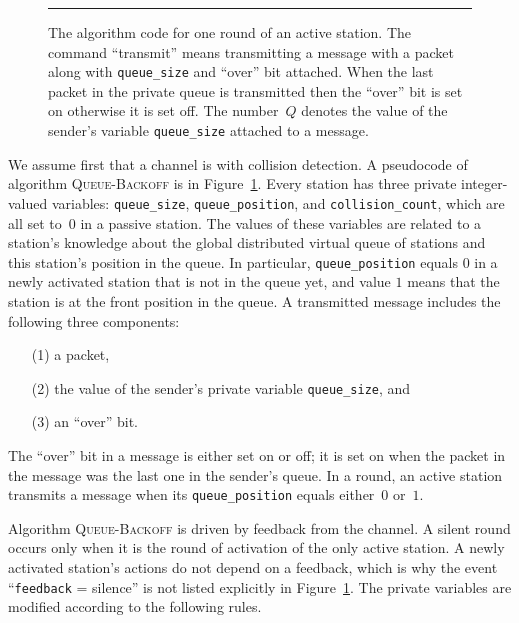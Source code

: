\documentclass[11pt]{article}
\newlength{\captionwidth}
\begin{document}
\begin{figure}[t]
\begin{center}
\rule{\textwidth}{0.75pt}

\parbox{\captionwidth}{\caption{\label{alg:queue-backoff}
The algorithm code for one round of an active station. 
The command ``transmit'' means transmitting a message with a packet along with \texttt{queue\_size} and ``over'' bit attached.
When the last packet in the private queue is transmitted then the  ``over'' bit is set on otherwise it is set off.
The number~$Q$ denotes the value of the sender's variable \texttt{queue\_size} attached to a message.
}}
\end{center}
\end{figure}


We assume first that a channel is with collision detection.
A pseudocode of algorithm \textsc{Queue-Backoff} is in Figure~\ref{alg:queue-backoff}.
Every station has three private integer-valued variables: \texttt{queue\_size}, \texttt{queue\_position}, and \texttt{collision\_count}, which are all set to~$0$ in a passive station.
The values of these variables are related to a station's knowledge about the global distributed virtual queue of stations and this station's position in the queue.
In particular, \texttt{queue\_position} equals $0$ in a newly activated station that is not in the queue yet, and value $1$ means that the station is at the front position in the queue.
A  transmitted message includes the following three components: 
\begin{enumerate}
\item[(1)] a packet, 
\item[(2)] the value of the sender's private variable \texttt{queue\_size}, and 
\item[(3)] an ``over'' bit.
\end{enumerate}
The ``over'' bit in a message is either set on or off; it is set on when the packet in the message was the last one in the sender's queue.
In a round, an active station  transmits a message when its \texttt{queue\_position} equals either~$0$ or~$1$.

Algorithm \textsc{Queue-Backoff} is driven by feedback from the channel.
A silent round occurs only when it is the round of activation of the only active station.
A newly activated station's actions do not depend on a feedback, which is why the event ``\texttt{feedback} = silence'' is not listed explicitly in Figure~\ref{alg:queue-backoff}.
The private variables are modified according to the following rules.
\end{document}
